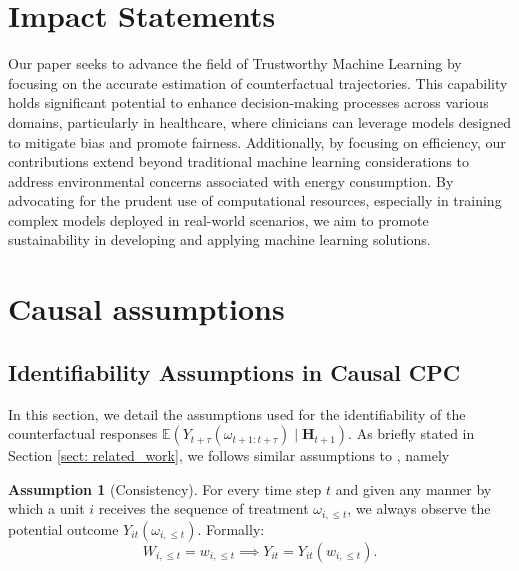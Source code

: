 \documentclass{article}
\theoremstyle{plain}
\theoremstyle{definition}
\newtheorem{assumption}[theorem]{Assumption}
\theoremstyle{remark}
\begin{document}
\newpage

% 


\newpage
\appendix
\section{Impact Statements} 
\label{sect: impact}
Our paper seeks to advance the field of Trustworthy Machine Learning by focusing on the accurate estimation of counterfactual trajectories. This capability holds significant potential to enhance decision-making processes across various domains, particularly in healthcare, where clinicians can leverage models designed to mitigate bias and promote fairness. Additionally, by focusing on efficiency, our contributions extend beyond traditional machine learning considerations to address environmental concerns associated with energy consumption. By advocating for the prudent use of computational resources, especially in training complex models deployed in real-world scenarios, we aim to promote sustainability in developing and applying machine learning solutions.

\section{Causal assumptions}
\subsection{Identifiability Assumptions in Causal CPC}
\label{subsect: identif_ass_CCPC}
In this section, we detail the assumptions used for the identifiability of the counterfactual responses $\mathbb{E}(Y_{t+\tau}(\omega_{t+1:t+\tau})\mid \mathbf{H}_{t+1})$. As briefly stated in Section \ref{sect: related_work},  we follows similar assumptions to \cite{robins-time-varying-exposures, robins2000MSM, bica2020estimatingCRN, Melnychuk2022CausalTF}, namely 
\begin{assumption}[Consistency] 
For every time step $t$ and given any manner by which a unit $i$ receives the sequence of treatment $\omega_{i,\leq t}$, we always observe the potential outcome $Y_{it}(\omega_{i,\leq t})$. Formally:
\begin{equation*}
    W_{i,\leq t} = w_{i,\leq t} \implies Y_{it} = Y_{it}(w_{i,\leq t}).
\end{equation*}
\label{assp: consist}
\end{assumption}
\end{document}
